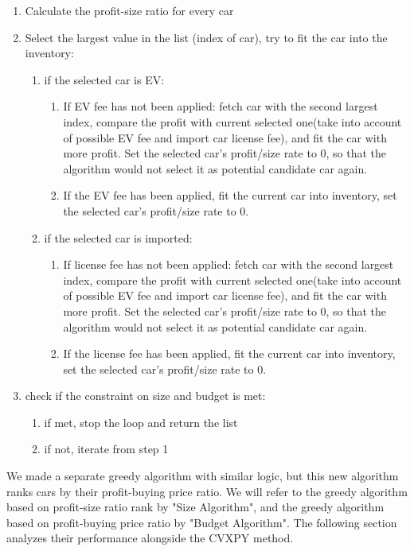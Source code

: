 \documentclass{article}
\begin{document}
\begin{enumerate}
\item Calculate the profit-size ratio for every car
\item Select the largest value in the list (index of car), try to fit the car into the inventory:
    \begin{enumerate}
        \item if the selected car is EV:
            \begin{enumerate}
                \item If EV fee has not been applied: fetch car with the second largest index, compare the profit with current selected one(take into account of possible EV fee and import car license fee), and fit the car with more profit. Set the selected car's profit/size rate to 0, so that the algorithm would not select it as potential candidate car again.
                \item If the EV fee has been applied, fit the current car into inventory, set the selected car's profit/size rate to 0.
            \end{enumerate}
        \item if the selected car is imported:
            \begin{enumerate}
                \item If license fee has not been applied: fetch car with the second largest index, compare the profit with current selected one(take into account of possible EV fee and import car license fee), and fit the car with more profit. Set the selected car's profit/size rate to 0, so that the algorithm would not select it as potential candidate car again.
                \item If the license fee has been applied, fit the current car into inventory, set the selected car's profit/size rate to 0.
            \end{enumerate}
    \end{enumerate}
\item check if the constraint on size and budget is met:
    \begin{enumerate}
        \item if met, stop the loop and return the list
        \item if not, iterate from step 1  
    \end{enumerate}
\end{enumerate}
We made a separate greedy algorithm with similar logic, but this new algorithm ranks cars by their profit-buying price ratio. We will refer to the greedy algorithm based on profit-size ratio rank by "Size Algorithm", and the greedy algorithm based on profit-buying price ratio by "Budget Algorithm". The following section analyzes their performance alongside the CVXPY method.
\end{document}
